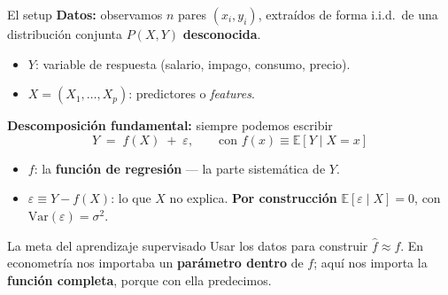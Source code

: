 \documentclass{beamer}
\newcommand{\E}{\mathbb{E}}
\newcommand{\Var}{\mathrm{Var}}
\newcommand{\1}{\mathbb{I}}
\begin{document}
\begin{frame}{El setup}
\small
\textbf{Datos:} observamos $n$ pares $(x_i, y_i)$, extraídos de forma i.i.d.\ de una distribución conjunta $P(X, Y)$ \textbf{desconocida}.
\begin{itemize}\itemsep3pt
  \item $Y$: variable de respuesta (salario, impago, consumo, precio).
  \item $X = (X_1, \ldots, X_p)$: predictores o \emph{features}.
\end{itemize}
\pause

\vspace{0.2cm}
\textbf{Descomposición fundamental:} siempre podemos escribir
\[ Y \;=\; f(X) \;+\; \varepsilon, \qquad \text{con } f(x) \equiv \E[Y \mid X = x] \]
\begin{itemize}\itemsep3pt
  \item $f$: la \textbf{función de regresión} --- la parte sistemática de $Y$.
  \item $\varepsilon \equiv Y - f(X)$: lo que $X$ no explica. \textbf{Por construcción} $\E[\varepsilon \mid X] = 0$, con $\Var(\varepsilon) = \sigma^2$.
\end{itemize}
\pause

\vspace{0.2cm}
\begin{block}{La meta del aprendizaje supervisado}
Usar los datos para construir $\hat{f} \approx f$. En econometría nos importaba un \textbf{parámetro dentro} de $f$; aquí nos importa la \textbf{función completa}, porque con ella predecimos.
\end{block}
\end{frame}
\end{document}
